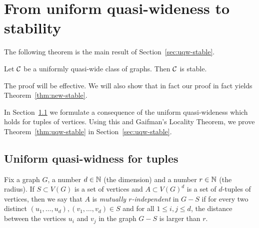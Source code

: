 
\section{From uniform quasi-wideness to stability}\label{sec:stable}
The following theorem is the main result of Section~\ref{sec:uqw-stable}.


\begin{theorem}\label{thm:uqw-stable}
	Let $\cal C$ be a uniformly quasi-wide class of graphs.
	Then $\cal C$ is stable. %
\end{theorem}
The proof will be effective. We will also show that in fact our  proof in fact yields Theorem~\ref{thm:new-stable}.


In Section~\ref{sec:uqw-tuples} we formulate a consequence of the uniform quasi-wideness which
holds for tuples of vertices. Using this and  Gaifman's Locality Theorem, we prove Theorem~\ref{thm:uqw-stable} in Section~\ref{sec:uqw-stable}.


\subsection{Uniform quasi-widness for tuples}\label{sec:uqw-tuples}
Fix a graph $G$, a number $d\in\N$ (the dimension) and a number $r\in \N$ (the radius).
If $S\subset V(G)$ is a set of vertices and $A\subset V(G)^d$ is a set of $d$-tuples of vertices,
then we say that $A$ is \emph{mutually $r$-independent} in $G-S$ 
if for every two distinct $(u_1,\ldots,u_d),(v_1,\ldots,v_d)\in S$
and for all $1\le i,j\le d$, the distance between the vertices $u_i$ and $v_j$ in the graph $G-S$
is larger than $r$.


